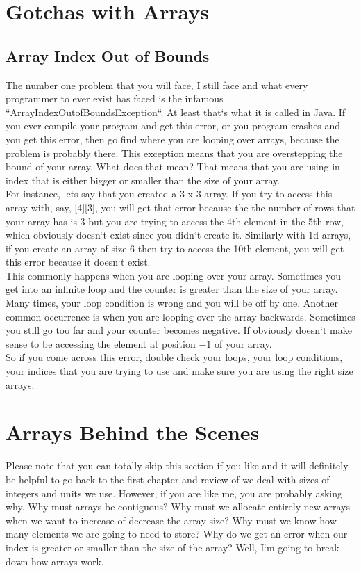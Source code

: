 \documentclass[11]{article}
\begin{document}
\section{Gotchas with Arrays}
\label{sec:gotchas}
\subsection{Array Index Out of Bounds}
The number one problem that you will face, I still face and what every programmer to ever exist has faced is the infamous ``ArrayIndexOutofBoundsException``. At least that`s what it is called in Java. If you ever compile your program and get this error, or you program crashes and you get this error, then go find where you are looping over arrays, because the problem is probably there. This exception means that you are overstepping the bound of your array. What does that mean? That means that you are using in index that is either bigger or smaller than the size of your array.\\

For instance, lets say that you created a 3 x 3 array. If you try to access this array with, say, [4][3], you will get that error because the the number of rows that your array has is 3 but you are trying to access the 4th element in the 5th row, which obviously doesn`t exist since you didn`t create it. Similarly with 1d arrays, if you create an array of size 6 then try to access the 10th element, you will get this error because it doesn`t exist.\\

This commonly happens when you are looping over your array. Sometimes you get into an infinite loop and the counter is greater than the size of your array. Many times, your loop condition is wrong and you will be off by one. Another common occurrence is when you are looping over the array backwards. Sometimes you still go too far and your counter becomes negative. If obviously doesn`t make sense to be accessing the element at position $-1$ of your array.\\

So if you come across this error, double check your loops, your loop conditions, your indices that you are trying to use and make sure you are using the right size arrays.

\section{Arrays Behind the Scenes}
Please note that you can totally skip this section if you like and it will definitely be helpful to go back to the first chapter and review of we deal with sizes of integers and units we use. However, if you are like me, you are probably asking why. Why must arrays be contiguous? Why must we allocate entirely new arrays when we want to increase of decrease the array size? Why must we know how many elements we are going to need to store? Why do we get an error when our index is greater or smaller than the size of the array? Well, I`m going to break down how arrays work.\\
\end{document}
